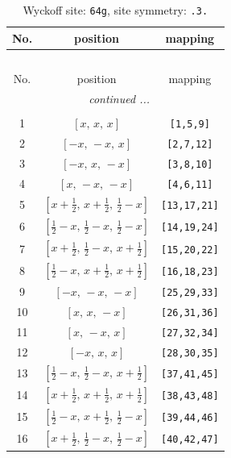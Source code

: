 \documentclass[fleqn,8pt]{jsarticle}
\begin{document}
\begin{longtable}{ccc}
\caption{Wyckoff site: {\tt 64g}, site symmetry: {\tt .3.}}
 \\
 \hline \hline
No. & position & mapping \\ \hline \endfirsthead

\multicolumn{2}{l}{\tablename\ \thetable{}} \\
 \hline \hline
No. & position & mapping \\ \hline \endhead

 \hline \hline
\multicolumn{2}{r}{\footnotesize\it continued ...} \\ \endfoot

 \hline \hline
\multicolumn{2}{r}{} \\ \endlastfoot

1 & $\left[ x,\, x,\, x \right]$ & {\tt [1,5,9]} \\ \hline
2 & $\left[ - x,\, - x,\, x \right]$ & {\tt [2,7,12]} \\ \hline
3 & $\left[ - x,\, x,\, - x \right]$ & {\tt [3,8,10]} \\ \hline
4 & $\left[ x,\, - x,\, - x \right]$ & {\tt [4,6,11]} \\ \hline
5 & $\left[ x + \frac{1}{2},\, x + \frac{1}{2},\, \frac{1}{2} - x \right]$ & {\tt [13,17,21]} \\ \hline
6 & $\left[ \frac{1}{2} - x,\, \frac{1}{2} - x,\, \frac{1}{2} - x \right]$ & {\tt [14,19,24]} \\ \hline
7 & $\left[ x + \frac{1}{2},\, \frac{1}{2} - x,\, x + \frac{1}{2} \right]$ & {\tt [15,20,22]} \\ \hline
8 & $\left[ \frac{1}{2} - x,\, x + \frac{1}{2},\, x + \frac{1}{2} \right]$ & {\tt [16,18,23]} \\ \hline
9 & $\left[ - x,\, - x,\, - x \right]$ & {\tt [25,29,33]} \\ \hline
10 & $\left[ x,\, x,\, - x \right]$ & {\tt [26,31,36]} \\ \hline
11 & $\left[ x,\, - x,\, x \right]$ & {\tt [27,32,34]} \\ \hline
12 & $\left[ - x,\, x,\, x \right]$ & {\tt [28,30,35]} \\ \hline
13 & $\left[ \frac{1}{2} - x,\, \frac{1}{2} - x,\, x + \frac{1}{2} \right]$ & {\tt [37,41,45]} \\ \hline
14 & $\left[ x + \frac{1}{2},\, x + \frac{1}{2},\, x + \frac{1}{2} \right]$ & {\tt [38,43,48]} \\ \hline
15 & $\left[ \frac{1}{2} - x,\, x + \frac{1}{2},\, \frac{1}{2} - x \right]$ & {\tt [39,44,46]} \\ \hline
16 & $\left[ x + \frac{1}{2},\, \frac{1}{2} - x,\, \frac{1}{2} - x \right]$ & {\tt [40,42,47]} \\
\end{longtable}
\end{document}
